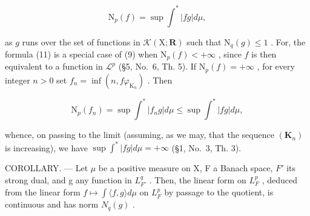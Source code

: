 \[
\mathrm{N} _ {p} (f) = \sup \int^ {*} | f g | d \mu ,\tag{11}
\]

as \(g\) runs over the set of functions in \(\mathcal{K}(\mathrm{X};\mathbf{R})\) such that \(\mathrm{N}_q(g)\leqslant 1\) . For, the formula (11) is a special case of (9) when \(\mathrm{N}_p(f) < +\infty\) , since \(f\) is then equivalent to a function in \(\mathcal{L}^p\) (§5, No.~6, Th. 5). If \(\mathrm{N}_p(f) = +\infty\) , for every integer \(n > 0\) set \(f_{n} = \inf (n,f\varphi_{\mathrm{K}_{n}})\) . Then

\[
\mathrm{N} _ {p} (f _ {n}) = \sup \int^ {*} | f _ {n} g | d \mu \leqslant \sup \int^ {*} | f g | d \mu ,
\]

whence, on passing to the limit (assuming, as we may, that the sequence \((\mathbf{K}_n)\) is increasing), we have \(\sup \int^{*}|fg| d\mu = +\infty\) (§1, No.~3, Th. 3).

COROLLARY. --- Let \(\mu\) be a positive measure on X, F a Banach space, \(F'\) its strong dual, and g any function in \(L_{F'}^{q}\) . Then, the linear form on \(L_{F}^{p}\) , deduced from the linear form \(f \mapsto \int \langle f, g \rangle d\mu\) on \(L_{F}^{p}\) by passage to the quotient, is continuous and has norm \(N_{q}(g)\) .

